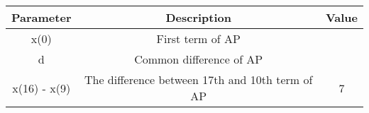     \begin{tabular}{|c|c|c|}
        \hline
        \textbf{Parameter} & \textbf{Description} & \textbf{Value} \\
        \hline
        x(0) & First term of AP &  \\ \hline
        d & Common difference of AP &  \\ \hline
        x(16) - x(9) & The difference between 17th and 10th term of AP & 7  \\ 
        \hline
    \end{tabular}

